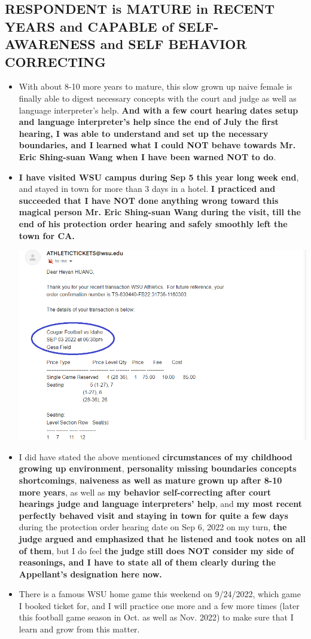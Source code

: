\documentclass[9pt, b5paper]{article}
\begin{document}
\subsection{RESPONDENT is MATURE in RECENT YEARS and CAPABLE of SELF-AWARENESS and SELF BEHAVIOR CORRECTING}
\label{sec-1-4}
\begin{itemize}
\item With about 8-10 more years to mature, this slow grown up naive female is finally able to digest necessary concepts with the court and judge as well as language interpreter's help. \textbf{And with a few court hearing dates setup and language interpreter's help since the end of July the first hearing, I was able to understand and set up the necessary boundaries, and I learned what I could NOT behave towards Mr. Eric Shing-suan Wang when I have been warned NOT to do}.
\item \textbf{I have visited WSU campus during Sep 5 this year long week end}, and stayed in town for more than 3 days in a hotel. \textbf{I practiced and succeeded that I have NOT done anything wrong toward this magical person Mr. Eric Shing-suan Wang during the visit, till the end of his protection order hearing and safely smoothly left the town for CA.}  

\includegraphics[width=.9\linewidth]{./pic/dearCousin_20220920_103727.png}
\item I did have stated the above mentioned \textbf{circumstances of my childhood growing up environment}, \textbf{personality missing boundaries concepts shortcomings}, \textbf{naiveness as well as mature grown up after 8-10 more years}, as well as \textbf{my behavior self-correcting after court hearings judge and language interpreters' help}, and \textbf{my most recent perfectly behaved visit and staying in town for quite a few days} during the protection order hearing date on Sep 6, 2022 on my turn, \textbf{the judge argued and emphasized that he listened and took notes on all of them}, but I do feel \textbf{the judge still does NOT consider my side of reasonings, and I have to state all of them clearly during the Appellant's designation here now.}
\item There is a famous WSU home game this weekend on 9/24/2022, which game I booked ticket for, and I will practice one more and a few more times (later this football game season in Oct. as well as Nov. 2022) to make sure that I learn and grow from this matter.


\end{itemize}
\end{document}
